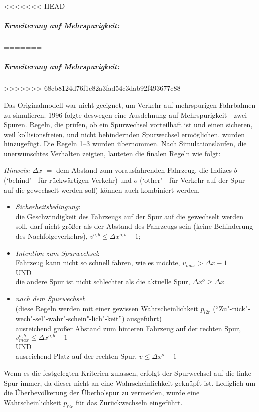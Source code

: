 <<<<<<< HEAD


\subparagraph{Erweiterung auf Mehrspurigkeit:}\sa{}
=======
\subparagraph{Erweiterung auf Mehrspurigkeit:}
>>>>>>> 68cb8124d76f1c82a3fad54c3dab92f493677c88

Das Originalmodell war nicht geeignet, um Verkehr auf mehrspurigen Fahrbahnen zu simulieren. 
1996 folgte deswegen eine Ausdehnung auf Mehrspurigkeit \cite{multi-lane} - zwei Spuren. 
Regeln, die prüfen, ob ein Spurwechsel vorteilhaft ist und einen sicheren, weil kollisionsfreien, und nicht behindernden Spurwechsel ermöglichen, wurden hinzugefügt. Die Regeln 1--3 wurden übernommen. Nach Simulationsläufen, die unerwünschtes Verhalten zeigten, lauteten die finalen Regeln wie folgt:

\textit{Hinweis:} $\Delta x$ $\widehat{=}$ dem Abstand zum vorausfahrenden Fahrzeug, die Indizes $b$ (\enquote*{behind} - für rückwärtigen Verkehr) und $o$ (\enquote*{other} - für Verkehr auf der Spur auf die gewechselt werden soll) können auch kombiniert werden. 

\begin{itemize}
	\item \textit{Sicherheitsbedingung}: 
	\\	
	die Geschwindigkeit des Fahrzeugs auf der Spur auf die gewechselt werden soll, darf nicht größer als der Abstand des Fahrzeugs sein (keine Behinderung des Nachfolgeverkehrs), $v^{o,b} \leq \Delta x^{o,b}-1$;
	\item \textit{Intention zum Spurwechsel}: 
	\\
	Fahrzeug kann nicht so schnell fahren, wie es möchte, $v_{max} > \Delta x-1$ \\
	UND\\
	die andere Spur ist nicht schlechter als die aktuelle Spur, $\Delta x^{o} \geq \Delta x$
	\item \textit{nach dem Spurwechsel}: 
	\\
	(diese Regeln werden mit einer gewissen Wahrscheinlichkeit $p_{l2r}$ (\enquote{Zu"-rück"-wech"-sel"-wahr"-schein"-lich"-keit}) ausgeführt) \\
	ausreichend großer Abstand zum hinteren Fahrzeug auf der rechten Spur, $v^{o,b}_{max} \leq \Delta x^{o,b}-1$ \\
	UND \\
	ausreichend Platz auf der rechten Spur, $v \leq \Delta x^{o}-1$
\end{itemize}

Wenn es die festgelegten Kriterien zulassen, erfolgt der Spurwechsel auf die linke Spur immer, da dieser nicht an eine Wahrscheinlichkeit geknüpft ist.
Lediglich um die Überbevölkerung der Überholspur zu vermeiden, wurde eine Wahrscheinlichkeit $p_{l2r}$ für das Zurückwechseln eingeführt.


